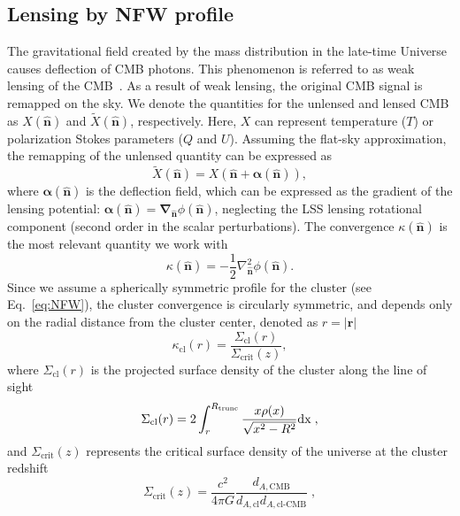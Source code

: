 \documentclass[prd, superscriptaddress, tightenlines, longbibliography, nofootinbib, eqsecnum, amsfonts, amsmath, floatfix, twocolumn, notitlepage]{revtex4-2}
\begin{document}
\subsection{Lensing by NFW profile}

The gravitational field created by the mass distribution in the late-time Universe causes deflection of CMB photons. This phenomenon is referred to as weak lensing of the CMB~\cite{Lewis:2006fu}. As a result of weak lensing, the original CMB signal is remapped on the sky. We denote the quantities for the unlensed and lensed CMB as $X (\hat{\mathbf{n}})$ and $\widetilde{X} (\hat{\mathbf{n}})$, respectively. Here, $X$ can represent temperature ($T$) or polarization Stokes parameters ($Q$ and $U$). Assuming the flat-sky approximation, the remapping of the unlensed quantity can be expressed as
\begin{equation}
\widetilde{X} (\hat{\mathbf{n}}) = X (\hat{\mathbf{n}} + \boldsymbol{\alpha}(\hat{\mathbf{n}})),
\end{equation}
where $\boldsymbol{\alpha} (\hat{\mathbf{n}})$ is the deflection field, which can be expressed as the gradient of the lensing potential: $\boldsymbol{\alpha} (\hat{\mathbf{n}}) = \boldsymbol{\nabla}_{\hat{\mathbf{n}}}\phi(\hat{\mathbf{n}})$, neglecting the LSS lensing rotational component (second order in the scalar perturbations). The convergence $\kappa (\hat{\mathbf{n}})$ is the most relevant quantity we work with
\begin{equation}
\kappa(\hat{\mathbf{n}}) = -\frac{1}{2}\nabla^2_{\hat{\mathbf{n}}}\phi(\hat{\mathbf{n}}).
\end{equation}
Since we assume a spherically symmetric profile for the cluster (see Eq.~\ref{eq:NFW}), the cluster convergence is circularly symmetric, and depends only on the radial distance from the cluster center, denoted as $r = |\mathbf{r}|$
\begin{equation}
\kappa_{\text{cl}}(r) = \frac{\Sigma_{\text{cl}}(r)}{\Sigma_{\text{crit}}(z)},
\end{equation}
where $\Sigma_{\text{cl}}(r)$ is the projected surface density of the cluster along the line of sight
\begin{equation}
\Sigma_{\rm{cl}}(r) = 2 \int_{r}^{R_{\rm{trunc}}}\frac{x\rho(x)}{\sqrt{x^2-R^2}} \rm{d} x \; ,
\end{equation}
and $\Sigma_{\text{crit}}(z)$ represents the critical surface density of the universe at the cluster redshift
\begin{equation}
\Sigma_{\text{crit}}(z) = \frac{c^2}{4\pi G}\frac{d_{A,\text{CMB}}}{d_{A,\text{cl}}d_{A,\text{cl-CMB}}} \; ,
\end{equation}
\end{document}
